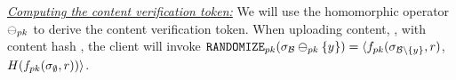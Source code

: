 %
%
%


\smallskip
\noindent\textit{\underline{Computing the content verification token:}}
%
We will use the homomorphic operator $\sigMinus[\pubKey]$ to derive the content verification token. When uploading content, \clientData, with content hash \genericCInputElmt, the client will invoke $\randomize[\pubKey](\genericSig[\blocklist] \sigMinus[\pubKey] 
\setDefn{\genericCInputElmt}) = \langle \randomizeFn[\pubKey](\genericSig[\genericSetDiff[\blocklist][\genericCInputElmt]], \genericRand)$,  $\ro(\randomizeFn[\pubKey](\genericSig[\emptyset], \genericRand)) \rangle$. 

